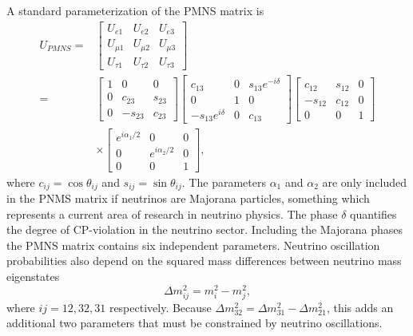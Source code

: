 A standard parameterization \cite{Workman:2022ynf} of the PMNS matrix is 
\begin{equation}
    \begin{split}
        U_{PMNS}=&\begin{bmatrix}
            U_{e1}&U_{e2}&U_{e3}\\
            U_{\mu 1}&U_{\mu 2}&U_{\mu 3}\\
            U_{\tau 1}&U_{\tau 2}&U_{\tau 3}
        \end{bmatrix}\\
        =&\begin{bmatrix}
            1&0&0\\0&c_{23}&s_{23}\\0&-s_{23}&c_{23}
        \end{bmatrix}
        \begin{bmatrix}
            c_{13}&0&s_{13}e^{-i\delta}\\0&1&0\\-s_{13}e^{i\delta}&0&c_{13}
        \end{bmatrix}
        \begin{bmatrix}
            c_{12}&s_{12}&0\\-s_{12}&c_{12}&0\\0&0&1
        \end{bmatrix}\\
        &\times
        \begin{bmatrix}
            e^{i\alpha_1/2}&0&0\\
            0&e^{i\alpha_2/2}&0\\
            0&0&1
        \end{bmatrix},
    \end{split}
\end{equation}
where $c_{ij}=\cos{\theta_{ij}}$ and $s_{ij}=\sin{\theta_{ij}}$. The parameters $\alpha_1$ and $\alpha_2$ are only included in the PNMS matrix if neutrinos are Majorana particles, something which represents a current area of research in neutrino physics. The phase $\delta$ quantifies the degree of CP-violation in the neutrino sector. Including the Majorana phases the PMNS matrix contains six independent parameters. Neutrino oscillation probabilities also depend on the squared mass differences between neutrino mass eigenstates
\begin{equation}
    \Delta m_{ij}^2=m_i^2-m_j^2,
\end{equation}
where $ij=12,32,31$ respectively. Because $\Delta m_{32}^2=\Delta m_{31}^2-\Delta m_{21}^2$, this adds an additional two parameters that must be constrained by neutrino oscillations. 

